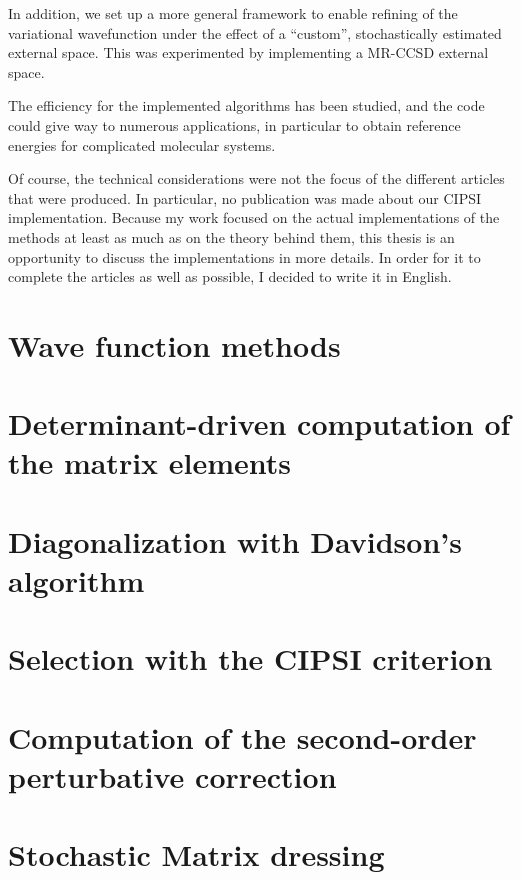 \documentclass[12pt,a4paper]{report}
\begin{document}
In addition, we set up a more general framework to enable refining of the variational wavefunction under the effect of a ``custom'', stochastically estimated external space. This was experimented by implementing a MR-CCSD external space.


The efficiency for the implemented algorithms has been studied, and the code could give way to numerous applications, in particular to obtain reference energies for complicated molecular systems.

Of course, the technical considerations were not the focus of the different articles that were produced. In particular, no publication was made about our CIPSI implementation. Because my work focused on the actual implementations of the methods at least as much as on the theory behind them, this thesis is an opportunity to discuss the implementations in more details. In order for it to complete the articles as well as possible, I decided to write it in English.



\chapter{Wave function methods}
\minitoc


\chapter{Determinant-driven computation of the matrix elements}
\minitoc


\chapter{Diagonalization with Davidson's algorithm}
\minitoc


\chapter{Selection with the CIPSI criterion}
\minitoc


\chapter{Computation of the second-order perturbative correction}
\minitoc


\chapter{Stochastic Matrix dressing}
\minitoc

\end{document}
